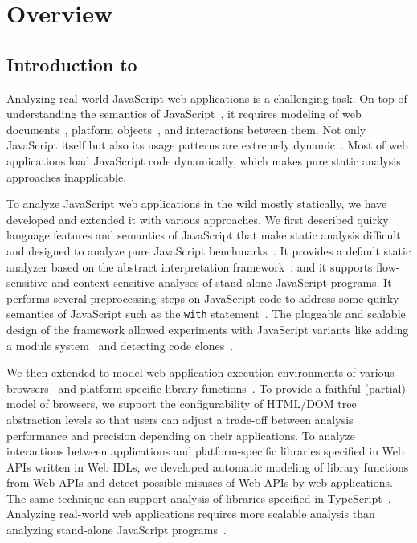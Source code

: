 \chapter{Overview}\label{c:1:overview}

\section{Introduction to }
\label{s:2:1:safe1}
Analyzing real-world JavaScript web applications is a challenging task.
On top of understanding the semantics of JavaScript~\cite{ecma5},
it requires modeling of web documents~\cite{W3C}, platform objects~\cite{tizen},
and interactions between them.
Not only JavaScript itself but also its usage patterns are extremely dynamic~\cite{dynamic,eval}.
Most of web applications load JavaScript code dynamically,
which makes pure static analysis approaches inapplicable.

To analyze JavaScript web applications in the wild mostly statically,
we have developed \safe and extended it with various approaches.
We first described quirky language features and semantics of JavaScript
that make static analysis difficult and designed \safe to analyze pure JavaScript
benchmarks~\cite{fool12}.  It provides a default static analyzer based on
the abstract interpretation framework~\cite{ai77},
and it supports flow-sensitive and context-sensitive analyses of stand-alone JavaScript programs.
It performs several preprocessing steps on JavaScript code
to address some quirky semantics of JavaScript such as
the \texttt{with} statement~\cite{dls13}.
The pluggable and scalable design of the framework allowed experiments with JavaScript variants
like adding a module system~\cite{oopsla12,modularity14}
and detecting code clones~\cite{emse16}.


We then extended \safe
to model web application execution environments of various browsers~\cite{ase15a} and
platform-specific library functions~\cite{fse14,safets}.  To provide a faithful (partial) model of browsers,
we support the configurability of HTML/DOM tree abstraction levels 
so that users can adjust a trade-off between analysis performance and precision 
depending on their applications.  To analyze interactions between applications
and platform-specific libraries specified in Web APIs written in Web IDLs,
we developed automatic modeling
of library functions from Web APIs and detect possible misuses of Web APIs
by web applications.  The same technique can support analysis of libraries specified
in TypeScript~\cite{ts}.  Analyzing real-world web applications requires
more scalable analysis than analyzing stand-alone JavaScript programs~\cite{ase15b,ecoop15}.


